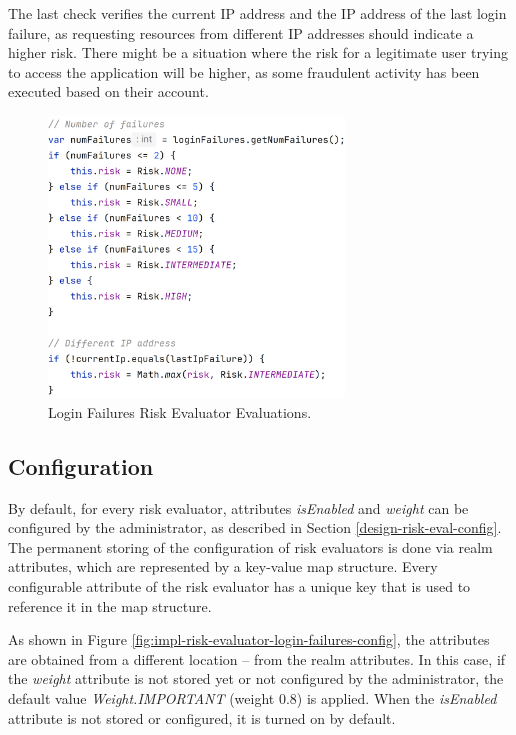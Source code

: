 The last check verifies the current IP address and the IP address of the last login failure, as requesting resources from different IP addresses should indicate a higher risk.
There might be a situation where the risk for a legitimate user trying to access the application will be higher, as some fraudulent activity has been executed based on their account. 

\begin{figure}[htbp]
  \centering
  \includegraphics[width=0.7\textwidth]{img/sections/6-implementation/loginFailuresEvals.png}
  \caption{Login Failures Risk Evaluator Evaluations.}
  \label{fig:impl-risk-evaluator-login-failures-evaluations}
\end{figure}

\subsection{Configuration}
By default, for every risk evaluator, attributes \textit{isEnabled} and \textit{weight} can be configured by the administrator, as described in Section \ref{design-risk-eval-config}.
The permanent storing of the configuration of risk evaluators is done via realm attributes, which are represented by a key-value map structure.
Every configurable attribute of the risk evaluator has a unique key that is used to reference it in the map structure.

As shown in Figure \ref{fig:impl-risk-evaluator-login-failures-config}, the attributes are obtained from a different location -- from the realm attributes.
In this case, if the \textit{weight} attribute is not stored yet or not configured by the administrator, the default value \textit{Weight.IMPORTANT} (weight 0.8) is applied.
When the \textit{isEnabled} attribute is not stored or configured, it is turned on by default.

